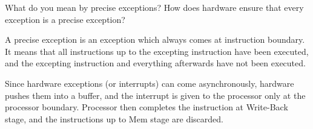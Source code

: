 \begin{ExerciseList}

\Exercise
What do you mean by precise exceptions? How does hardware ensure that every exception is a precise exception?

\Answer
A precise exception is an exception which always comes at instruction boundary.
It means that all instructions up to the excepting instruction have been executed, 
and the excepting instruction and everything afterwards have not been executed.

Since hardware exceptions (or interrupts) can come asynchronously, hardware pushes them into a buffer,
and the interrupt is given to the processor only at the processor boundary. Processor then completes the
instruction at Write-Back stage, and the instructions up to Mem stage are discarded.


\end{ExerciseList}
